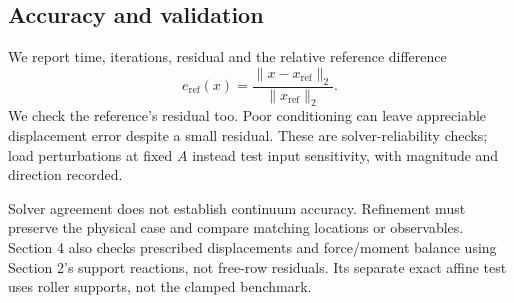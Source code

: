 \subsection{Accuracy and validation}
We report time, iterations, residual and the relative reference difference
\begin{equation}
 e_{\mathrm{ref}}(x)=
 \frac{\lVert x-x_{\mathrm{ref}}\rVert_2}{\lVert x_{\mathrm{ref}}\rVert_2}.
 \label{eq:solvers-reference-error}
\end{equation}
\nopagebreak[4]
We check the reference's residual too. Poor conditioning can leave
appreciable displacement error despite a small residual. These are
solver-reliability checks; load perturbations at fixed $A$ instead test
input sensitivity, with magnitude and direction recorded.

Solver agreement does not establish continuum accuracy. Refinement must
preserve the physical case and compare matching locations or observables.
Section 4 also checks prescribed displacements and force/moment balance
using Section 2's support reactions, not free-row residuals. Its separate
exact affine test uses roller supports, not the clamped benchmark.
